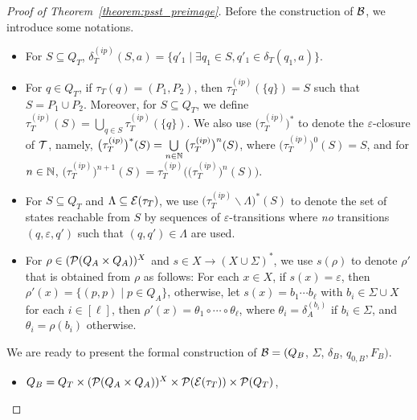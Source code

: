 \begin{proof}[Proof of Theorem~\ref{theorem:psst_preimage}]
Before the construction of $\mathcal{B}$, we introduce some notations.
\begin{itemize}
\item For $S \subseteq Q_T$, $\delta^{(ip)}_T(S, a) = \{q'_1 \mid \exists q_1 \in S, q'_1 \in \delta_T(q_1, a)\}$.
%
\item For $q \in Q_T$,  if $\tau_T(q) = (P_1, P_2)$, then $\tau^{(ip)}_T(\{q\})=S$ such that $S = P_1 \cup P_2$. 
Moreover, for $S \subseteq Q_T$, we define $\tau^{(ip)}_T(S) = \bigcup \limits_{q \in S} \tau^{(ip)}_T(\{q\})$. We also use $\big(\tau^{(ip)}_T\big)^\ast$ to denote the $\varepsilon$-closure of $\mathcal{T}$, namely, $\big(\tau^{(ip)}_T\big)^\ast(S) = \bigcup \limits_{n \in \mathbb{N}} \big(\tau^{(ip)}_T\big)^{n}(S)$, where $\big(\tau^{(ip)}_T\big)^{0}(S) = S$, and for $n \in \mathbb{N}$, $\big(\tau^{(ip)}_T\big)^{n+1}(S) = \tau^{(ip)}_T\big(\big(\tau^{(ip)}_T\big)^{n}(S)\big)$. 
%
\item For $S \subseteq Q_T$ and $\Lambda \subseteq  \mathcal{E}(\tau_T)$, we use $\big(\tau^{(ip)}_T \backslash \Lambda\big)^\ast(S)$ to denote the set of states reachable from $S$ by sequences of $\varepsilon$-transitions where {\it no} transitions $(q, \varepsilon, q')$ such that $(q, q') \in \Lambda$ are used.
%
% 
\item For $\rho \in (\mathcal{P}(Q_A \times Q_A ))^{X}$ and $s \in X \rightarrow (X \cup \Sigma)^{\ast}$, we use $s(\rho)$ to denote $\rho'$ that is obtained from $\rho$ as follows: For each $x \in X$, if $s(x) = \varepsilon$, then $\rho'(x) = \{(p, p) \mid p \in Q_A\}$, otherwise, let $s(x) = b_1 \cdots b_\ell$ with $b_i \in \Sigma \cup X$ for each $i \in [\ell]$, then $\rho'(x) = \theta_1 \circ \cdots \circ \theta_\ell$, where $\theta_i = \delta^{(b_i)}_A$ if $b_i \in \Sigma$, and $\theta_i = \rho(b_i)$ otherwise.
\end{itemize}

We are ready to present the formal construction of $\mathcal{B} =  (Q_B$, $\Sigma$, $\delta_B$, $q_{0, B}, F_B)$. 
\begin{itemize}
\item $Q_B = Q_T \times (\mathcal{P}(Q_A \times Q_A ))^{X} \times \mathcal{P}(\mathcal{E}(\tau_T)) \times \mathcal{P}(Q_T)$, 


\end{itemize}
\end{proof}
